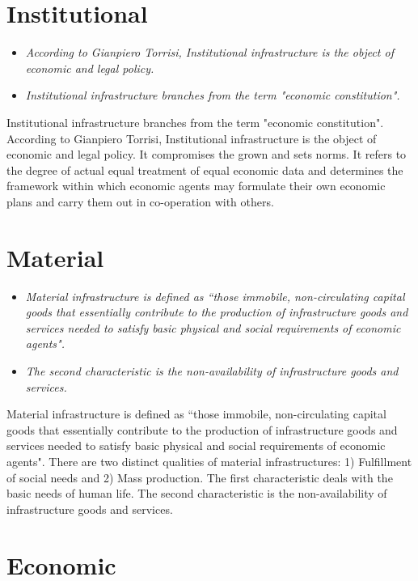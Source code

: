 \section{Institutional}\label{institutional}

\begin{itemize}
\item
  \emph{According to Gianpiero Torrisi, Institutional infrastructure is
  the object of economic and legal policy.}
\item
  \emph{Institutional infrastructure branches from the term "economic
  constitution".}
\end{itemize}

Institutional infrastructure branches from the term "economic
constitution". According to Gianpiero Torrisi, Institutional
infrastructure is the object of economic and legal policy. It
compromises the grown and sets norms. It refers to the degree of actual
equal treatment of equal economic data and determines the framework
within which economic agents may formulate their own economic plans and
carry them out in co-operation with others.

\section{Material}\label{material}

\begin{itemize}
\item
  \emph{Material infrastructure is defined as ``those immobile,
  non-circulating capital goods that essentially contribute to the
  production of infrastructure goods and services needed to satisfy
  basic physical and social requirements of economic agents".}
\item
  \emph{The second characteristic is the non-availability of
  infrastructure goods and services.}
\end{itemize}

Material infrastructure is defined as ``those immobile, non-circulating
capital goods that essentially contribute to the production of
infrastructure goods and services needed to satisfy basic physical and
social requirements of economic agents". There are two distinct
qualities of material infrastructures: 1) Fulfillment of social needs
and 2) Mass production. The first characteristic deals with the basic
needs of human life. The second characteristic is the non-availability
of infrastructure goods and services.

\section{Economic}\label{economic}

